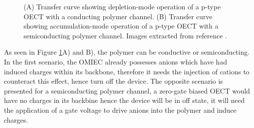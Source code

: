 \begin{figure}[h]
	\centering
	\hspace{2em}
	\caption{(A) Transfer curve showing depletion-mode operation of a p-type OECT with a conducting polymer channel. (B) Transfer curve showing accumulation-mode operation of a p-type OECT with a semiconducting polymer channel. Images extracted from reference \cite{rivnayOrganicElectrochemicalTransistors2018}.}
	\label{fig:modes}
\end{figure}

As seen in Figure \ref{fig:modes}A) and B), the polymer can be conductive or semiconducting. In the first scenario, the OMIEC already possesses anions which have had induced charges within its backbone, therefore it needs the injection of cations to counteract this effect, hence turn off the device. The opposite scenario is presented for a semiconducting polymer channel, a zero-gate biased OECT would have no charges in its backbine hence the device will be in off state, it will need the application of a gate voltage to drive anions into the polymer and induce charges.


